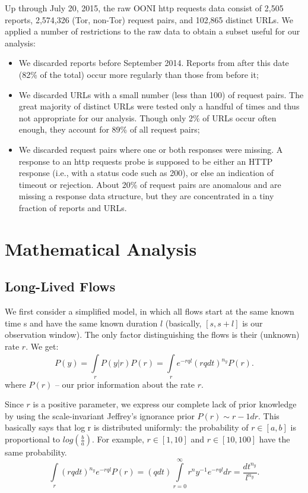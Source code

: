 \documentclass[12pt]{spieman}
\begin{document}
\begin{spacing}{2}
Up through July 20, 2015, the raw OONI http requests data consist of 2,505 reports, 2,574,326 (Tor, non-Tor) request pairs, and 102,865 distinct URLs. We applied a number of restrictions to the raw data to obtain a subset useful for our analysis:
\begin{itemize}
\item We discarded reports before September 2014. Reports from after this date (82\% of the total) occur more regularly than those from before it;
\item We discarded URLs with a small number (less than 100) of request pairs. The great majority of distinct URLs were tested only a handful of times and thus not appropriate for our analysis. Though only 2\% of URLs occur often enough, they account for 89\% of all request pairs;
\item We discarded request pairs where one or both responses were missing. A response to an http requests probe is supposed to be either an HTTP response (i.e., with a status code such as 200), or else an indication of timeout or rejection. About 20\% of request pairs are anomalous and are missing a response data structure, but they are concentrated in a tiny fraction of reports and URLs.
\end{itemize}

\section{Mathematical Analysis}
\subsection{Long-Lived Flows}
We first consider a simplified model, in which all flows start at the same known time s and have the same known duration $l$ (basically, $[s,s+l]$ is our observation window). The only factor distinguishing the flows is their (unknown) rate $r$. We get:
\begin{equation}
\label{1}
P(y) = \int\limits_{r}^{} P(y|r)P(r)= \int\limits_{r}^{} e^{-rql} (rq dt)^{n_{y}}P(r).
\end{equation}
where $P(r)$ – our prior information about the rate $r$.  

Since $r$ is a positive parameter, we express our complete lack of prior knowledge by using the scale-invariant Jeffrey’s ignorance prior $P(r) 
\sim r -1 dr$. This basically says that log r is distributed uniformly: the probability of $r \in [a,b]$ is proportional to $log(\frac{b}{a})$. For example, $r \in [1,10]$ and $r \in [10,100]$ have the same probability.
\begin{equation}
\label{2}
\int\limits_{r}^{} (rq dt)^{n_{y}} e^{-rql} P(r) = (q dt) \int\limits_{r=0}^{\infty} r^{n} y^{-1} e^{-rql} dr = \frac{dt^{n_{y}}}{l^{n_{y}}}.
\end{equation}


\end{spacing}
\end{document}
